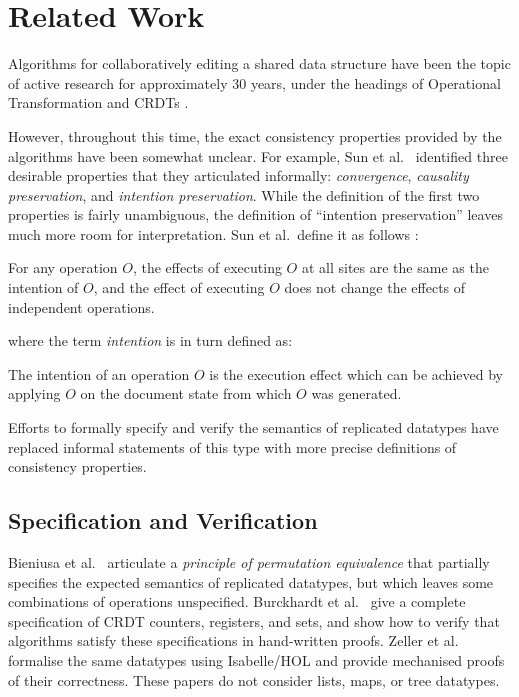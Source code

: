 \section{Related Work}\label{sec:relwork}

Algorithms for collaboratively editing a shared data structure have been the topic of active research for approximately 30 years, under the headings of Operational Transformation \cite{Ellis:1989ue,Nichols:1995fd,Ressel:1996wx,Sun:1998un,Sun:1998vf,Suleiman:1997gl,Suleiman:1998eu,Vidot:2000ch,Imine:2003ks,Li:2004er,Li:2008hw,Oster:2006tr} and CRDTs \cite{Shapiro:2011wy,Shapiro:2011un,Roh:2011dw,Preguica:2009fz,Oster:2006wj,Weiss:2010hx,Nedelec:2013ky,Nedelec:2016eo,Grishchenko:2014eh,Kleppmann:2016ve}.

However, throughout this time, the exact consistency properties provided by the algorithms have been somewhat unclear.
For example, Sun et al.~\cite{Sun:1998un} identified three desirable properties that they articulated informally: \emph{convergence}, \emph{causality preservation}, and \emph{intention preservation}.
While the definition of the first two properties is fairly unambiguous, the definition of ``intention preservation'' leaves much more room for interpretation.
Sun et al.\ define it as follows \cite{Sun:1998un}:
\begin{displayquote}
For any operation $O$, the effects of executing $O$ at all sites are the same as the intention of $O$, and the effect of executing $O$ does not change the effects of independent operations.
\end{displayquote}
where the term \emph{intention} is in turn defined as:
\begin{displayquote}
The intention of an operation $O$ is the execution effect which can be achieved by applying $O$ on the document state from which $O$ was generated.
\end{displayquote}
Efforts to formally specify and verify the semantics of replicated datatypes have replaced informal statements of this type with more precise definitions of consistency properties.

\subsection{Specification and Verification}

Bieniusa et al.~\cite{Bieniusa:2012gt} articulate a \emph{principle of permutation equivalence} that partially specifies the expected semantics of replicated datatypes, but which leaves some combinations of operations unspecified.
Burckhardt et al.~\cite{Burckhardt:2014ft} give a complete specification of CRDT counters, registers, and sets, and show how to verify that algorithms satisfy these specifications in hand-written proofs.
Zeller et al.~\cite{Zeller:2014fl} formalise the same datatypes using Isabelle/HOL and provide mechanised proofs of their correctness.
These papers do not consider lists, maps, or tree datatypes.

